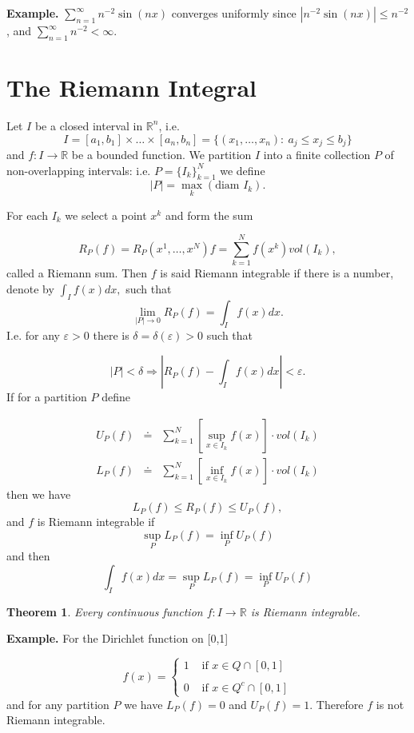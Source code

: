 \documentclass[12pt]{report}
\newtheorem{theorem}{Theorem}[section]
\begin{document}
\medskip
\noindent
{\bf Example.} $\sum\limits^\infty_{n=1} n^{-2}\sin (nx)$
converges uniformly since $|n^{-2}\sin (nx)|\le n^{-2}$, and
$\sum\limits^\infty_{n=1}  n^{-2} < \infty$.

 

\section{The Riemann Integral}
 Let $I$ be a closed interval in $\mathbb{R}^n$, i.e.
\[ I = [a_1, b_1]\times \dots \times [a_n, b_n] = \{(x_1, \dots, x_n): \
a_j \le x_j \le  b_j\}
\] and $f: I \longrightarrow \mathbb{R}$ be a bounded function.  We
partition $I$ into a finite collection $P$ of non-overlapping intervals:
i.e. $P = \{I_k\}^N_{k = 1}$ we define
\[|P| = \max _k (\mbox{diam } I_k).
\]

For each $I_k$ we select a point $x^k$ and form the sum

\[ R_P (f) = R_P (x^1, \dots, x^N) f= \sum^N_{k=1} f(x^k) vol (I_k),
\]
called a Riemann sum.  Then $f$ is said Riemann integrable if  there is
a number, denote by $\int_I f(x) dx,$ such that
\[
\lim_{|P| \to 0} R_P(f) = \int_I f(x) dx.
\]
I.e. for any $\varepsilon > 0$ there is $\delta = \delta (\varepsilon) >
0$ such that

\[ |P| < \delta \Longrightarrow \left |R_P(f) - \int_I f(x) dx \right | <
\varepsilon.
\]
If for a partition $P$ define

\begin{eqnarray*} U_P(f) &\doteq& \sum\limits^N_{k=1} \left [
\sup_{x \in I_k} f(x)
\right ]
\cdot vol (I_k)\\ L_P (f) &\doteq& \sum\limits^N_{k=1} \left [
\inf_{x \in I_k} f(x) \right ] \cdot vol (I_k)
\end{eqnarray*} then we have
\[ L_P(f) \le R_P(f)\le U_P(f),
\] and $f$ is Riemann integrable if 
\[
\sup_{P} L_P(f) = \inf_P U_P(f)
\] and then
\[
\int_I f(x) dx =\sup_{P} L_P(f) = \inf_P U_P(f)
\]

\begin{theorem}
\label{th:cont-int}
Every continuous function $ f: I
\longrightarrow
\mathbb{R}$ is Riemann integrable.
\end{theorem}
\textbf{Example.}  For the Dirichlet function on [0,1]

\[f(x) = \left \{\begin{array}{ll} 1 &\mbox{ if } x \in Q \cap [0,1]\\
\\ 0 &\mbox{ if }x \in Q^c \cap [0,1] \end{array} \right .
\]
and for any partition $P$ we have
$ L_P(f) = 0$  and  $U_P (f) = 1$.
Therefore $f$ is not Riemann integrable.
\end{document}
